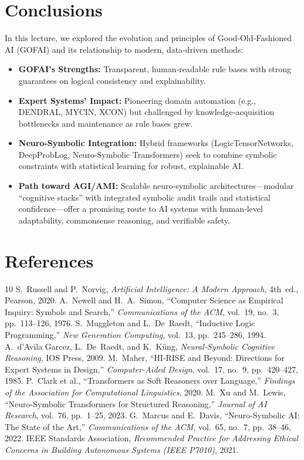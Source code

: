 \documentclass[12pt]{article}
\begin{document}
\section{Conclusions}

In this lecture, we explored the evolution and principles of Good‐Old‐Fashioned AI (GOFAI) and its relationship to modern, data‐driven methods:

\begin{itemize}
  \item \textbf{GOFAI’s Strengths:}  
    Transparent, human‐readable rule bases with strong guarantees on logical consistency and explainability.
  \item \textbf{Expert Systems’ Impact:}  
    Pioneering domain automation (e.g., DENDRAL, MYCIN, XCON) but challenged by knowledge‐acquisition bottlenecks and maintenance as rule bases grew.
  \item \textbf{Neuro‐Symbolic Integration:}  
    Hybrid frameworks (LogicTensorNetworks, DeepProbLog, Neuro‐Symbolic Transformers) seek to combine symbolic constraints with statistical learning for robust, explainable AI.
  \item \textbf{Path toward AGI/AMI:}  
    Scalable neuro‐symbolic architectures—modular “cognitive stacks” with integrated symbolic audit trails and statistical confidence—offer a promising route to AI systems with human‐level adaptability, commonsense reasoning, and verifiable safety.
\end{itemize}

\section*{References}
\begin{thebibliography}{10}
    S.~Russell and P.~Norvig,
    \emph{Artificial Intelligence: A Modern Approach}, 4th~ed., Pearson, 2020.
    A.~Newell and H.~A.~Simon,
    “Computer Science as Empirical Inquiry: Symbols and Search,”
    \emph{Communications of the ACM}, vol.~19, no.~3, pp.\ 113–126, 1976.
    S.~Muggleton and L.~De~Raedt,
    “Inductive Logic Programming,”
    \emph{New Generation Computing}, vol.~13, pp.\ 245–286, 1994.
    A.~d’Avila Garcez, L.~De~Raedt, and K.~Küng,
    \emph{Neural‐Symbolic Cognitive Reasoning}, IOS Press, 2009.
    M.~Maher,
    “HI‐RISE and Beyond: Directions for Expert Systems in Design,”
    \emph{Computer‐Aided Design}, vol.~17, no.~9, pp.\ 420–427, 1985.
    P.~Clark et al.,
    “Transformers as Soft Reasoners over Language,”
    \emph{Findings of the Association for Computational Linguistics}, 2020.
    M.~Xu and M.~Lewis,
    “Neuro‐Symbolic Transformers for Structured Reasoning,”
    \emph{Journal of AI Research}, vol.~76, pp.\ 1–25, 2023.
    G.~Marcus and E.~Davis,
    “Neuro‐Symbolic AI: The State of the Art,”
    \emph{Communications of the ACM}, vol.~65, no.~7, pp.\ 38–46, 2022.
    IEEE Standards Association,
    \emph{Recommended Practice for Addressing Ethical Concerns in Building Autonomous Systems (IEEE P7010)}, 2021.
\end{thebibliography}
\end{document}
